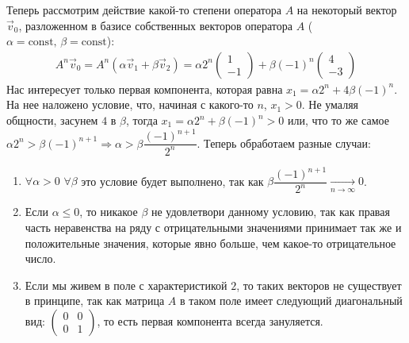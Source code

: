 \begin{solution}
    Теперь рассмотрим действие какой-то степени оператора $A$ на некоторый вектор $\vec{v}_0$, разложенном в базисе собственных векторов оператора $A$ ($\alpha = \text{const},\,\beta=\text{const}$):
    \begin{gather}
        A^n \vec{v}_0 = A^n(\alpha \vec{v}_1 + \beta \vec{v}_2) = \alpha 2^n 
        \begin{pmatrix}
            1 \\ -1
        \end{pmatrix} + \beta (-1)^n
        \begin{pmatrix}
            4 \\ -3
        \end{pmatrix}
    \end{gather}
    Нас интересует только первая компонента, которая равна $x_1 = \alpha 2^n + 4\beta(-1)^n$. На нее наложено условие, что, начиная с какого-то $n$, $x_1 > 0$. Не умаляя общности, засунем $4$ в $\beta$, тогда $x_1 = \alpha 2^n + \beta (-1)^n > 0$ или, что то же самое $\alpha 2^n > \beta (-1)^{n+1} \Longrightarrow \alpha > \beta \dfrac{(-1)^{n+1}}{2^n}$. Теперь обработаем разные случаи:
    \begin{enumerate}
        \item $\forall \alpha > 0 \,\, \forall \beta $ это условие будет выполнено, так как $\beta \dfrac{(-1)^{n+1}}{2^n} \xrightarrow[n\to\infty]{}0$.
        \item Если $\alpha \leq 0$, то никакое $\beta$ не удовлетвори данному условию, так как правая часть неравенства на ряду с отрицательными значениями принимает так же и положительные значения, которые явно больше, чем какое-то отрицательное число.
        \item Если мы живем в поле с характеристикой $2$, то таких векторов не существует в принципе, так как матрица $A$ в таком поле имеет следующий диагональный вид: $\begin{pmatrix}
            0 & 0 \\
            0 & 1 
        \end{pmatrix}$, то есть первая компонента всегда зануляется.
    \end{enumerate}
\end{solution}